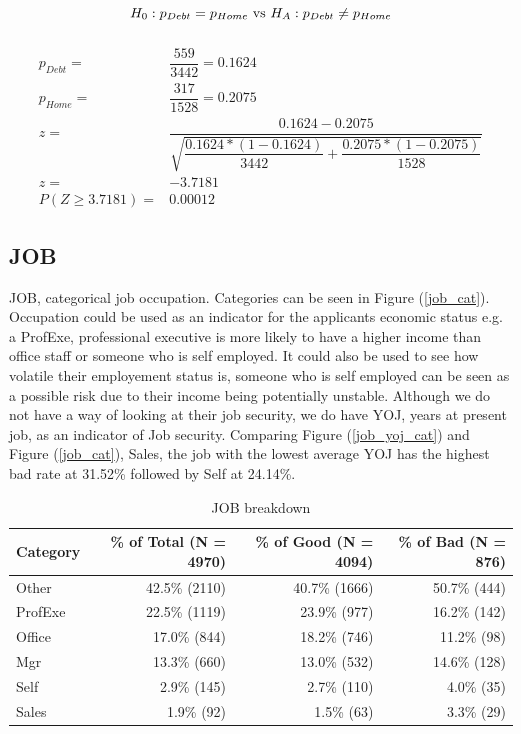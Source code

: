\begin{equation}\label{Hypo}
H_{0}: p_{Debt} = p_{Home} \textup{ vs } H_{A}: p_{Debt} \neq p_{Home}
\end{equation}

\begin{equation}\label{TTest}
\begin{aligned}
\\
p_{Debt} =& \dfrac{559}{3442} = 0.1624\\
p_{Home} =& \dfrac{317}{1528} = 0.2075\\
z =& \dfrac{0.1624 - 0.2075}{\sqrt{\dfrac{0.1624 * (1 - 0.1624)}{3442} + \dfrac{0.2075 * (1 - 0.2075)}{1528}}} \\ 
z =& - 3.7181 \\
P(Z \geq 3.7181) =& 0.00012
\end{aligned}
\end{equation}

\subsection*{JOB}

JOB, categorical job occupation. Categories can be seen in Figure (\ref{job_cat}). Occupation could be used as an indicator for the applicants economic status e.g. a ProfExe, professional executive is more likely to have a higher income than office staff or someone who is self employed. It could also be used to see how volatile their employement status is, someone who is self employed can be seen as a possible risk due to their income being potentially unstable. Although we do not have a way of looking at their job security, we do have YOJ, years at present job, as an indicator of Job security. Comparing Figure (\ref{job_yoj_cat}) and Figure (\ref{job_cat}), Sales, the job with the lowest average YOJ has the highest bad rate at 31.52\% followed by Self at 24.14\%. 

\begin{table}[H]
	\centering
	\renewcommand{\arraystretch}{2}
	\begin{tabular}{lrrr}
		\toprule
		Category & \% of Total (N = 4970) & \% of Good (N = 4094) & \% of Bad (N = 876) \\
		\midrule
		Other & 42.5\% (2110) & 40.7\% (1666) &  50.7\% (444)  \\
		ProfExe & 22.5\% (1119) & 23.9\% (977) &  16.2\% (142)  \\
		Office & 17.0\% (844) & 18.2\% (746) &  11.2\% (98)  \\
		Mgr &  13.3\% (660) & 13.0\% (532) & 14.6\% (128)  \\
		Self & 2.9\% (145) & 2.7\% (110) &  4.0\% (35)  \\
		Sales & 1.9\% (92) & 1.5\% (63) &  3.3\% (29)  \\
		\bottomrule
	\end{tabular}
	\caption{JOB breakdown \label{job_count_tbl}}
\end{table}


